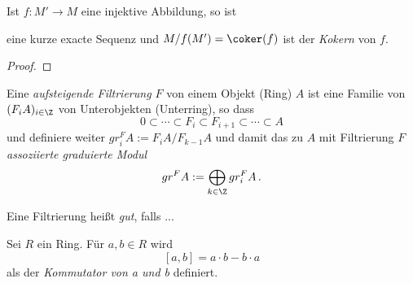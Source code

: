 \begin{prop}
Ist $f:M'\rightarrow M$ eine injektive Abbildung, so ist
\begin{center}
\end{center}
eine kurze exacte Sequenz und $M/f(M')=\coker(f)$ ist der \emph{Kokern} von
$f$.
\end{prop}
\begin{proof}
    
\end{proof}

\begin{defn}[Filtrierung] \label{defn:Filtrierung}
\cite[Def 10.13.1.]{stacks-project}
\cite[Rem 2.5.]{elliottDmod}
Eine \emph{aufsteigende Filtrierung $F$} von einem Objekt (Ring) $A$ ist eine
Familie von $(F_iA)_{i\in\Z}$ von Unterobjekten (Unterring), so dass 
\[ 0\subset\cdots\subset F_i\subset F_{i+1} \subset \cdots \subset A \]
und definiere weiter $gr_i^FA:=F_iA\slash F_{k-1}A$ und damit das zu $A$ mit
Filtrierung $F$ \emph{assoziierte graduierte Modul} 
\[gr^FA:=\bigoplus_{k\in\Z}gr_i^FA \,. \]
\begin{comment}
$gr_i^F$ als was??
\end{comment}
\end{defn}

\begin{defn}
\cite{ayoubIntro}
\cite[Def 3.2.1]{sabbah_cimpa90}
Eine Filtrierung heißt \emph{gut}, falls ...
\end{defn}

\begin{defn}[Kommutator]%
Sei $R$ ein Ring. Für $a,b\in R$ wird
\[[a,b]=a\cdot b-b\cdot a\]
als der \emph{Kommutator von a und b} definiert.
\end{defn}

